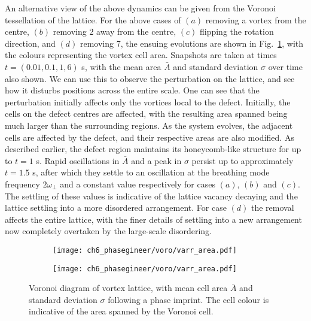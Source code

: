 An alternative view of the above dynamics can be given from the Voronoi tessellation of the lattice. For the above cases of $(a)$ removing a vortex from the centre, $(b)$ removing 2 away from the centre, $(c)$ flipping the rotation direction, and $(d)$ removing 7, the ensuing evolutions are shown in Fig.~\ref{fig:voronoisarea}, with the colours representing the vortex cell area. Snapshots are taken at times $t=(0.01,0.1,1,6)$ s, with the mean area $\bar{A}$ and standard deviation $\sigma$ over time also shown. We can use this to observe the perturbation on the lattice, and see how it disturbs positions across the entire scale. One can see that the perturbation initially affects only the vortices local to the defect. Initially, the cells on the defect centres are affected, with the resulting area spanned being much larger than the surrounding regions. As the system evolves, the adjacent cells are affected by the defect, and their respective areas are also modified. As described earlier, the defect region maintains its honeycomb-like structure for up to $t=1$ s. Rapid oscillations in $\bar{A}$ and a peak in $\sigma$ persist up to approximately $t=1.5$ s, after which they settle to an oscillation at the breathing mode frequency $2\omega_\perp$ and a constant value respectively for cases $(a)$, $(b)$ and $(c)$. The settling of these values is indicative of the lattice vacancy decaying and the lattice settling into a more disordered arrangement. For case $(d)$ the removal affects the entire lattice, with the finer details of settling into a new arrangement now completely overtaken by the large-scale disordering.

\begin{figure}\centering
    \begin{subfigure}{0.6\textwidth}
        \texttt{[image: ch6\_phasegineer/voro/varr\_area.pdf]}
    \end{subfigure}
    \begin{subfigure}{0.6\textwidth}
        \texttt{[image: ch6\_phasegineer/voro/varr\_area.pdf]}
    \end{subfigure}
    \caption{Voronoi diagram of vortex lattice, with mean cell area $\bar{A}$ and standard deviation $\sigma$ following a phase imprint. The cell colour is indicative of the area spanned by the Voronoi cell.}\label{fig:voronoisarea}
\end{figure}

